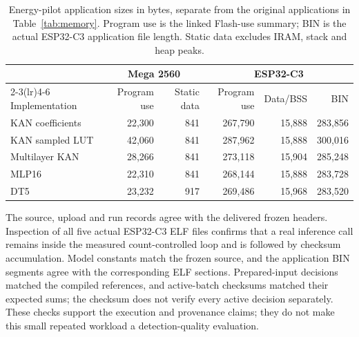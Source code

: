 \begin{table}[t]
\caption{Energy-pilot application sizes in bytes, separate from the original applications in Table~\ref{tab:memory}. Program use is the linked Flash-use summary; BIN is the actual ESP32-C3 application file length. Static data excludes IRAM, stack and heap peaks.}
\label{tab:pilot-memory}
\centering\small\setlength{\tabcolsep}{5pt}
\begin{tabular}{lrrrrr}
\toprule
& \multicolumn{2}{c}{Mega 2560} & \multicolumn{3}{c}{ESP32-C3}\\
\cmidrule(lr){2-3}\cmidrule(lr){4-6}
Implementation & Program use & Static data & Program use & Data/BSS & BIN\\
\midrule
KAN coefficients & 22,300 & 841 & 267,790 & 15,888 & 283,856\\
KAN sampled LUT & 42,060 & 841 & 287,962 & 15,888 & 300,016\\
Multilayer KAN & 28,266 & 841 & 273,118 & 15,904 & 285,248\\
MLP16 & 22,310 & 841 & 268,144 & 15,888 & 283,728\\
DT5 & 23,232 & 917 & 269,486 & 15,968 & 283,520\\
\bottomrule
\end{tabular}
\end{table}

The source, upload and run records agree with the delivered frozen headers. Inspection of all five actual ESP32-C3 ELF files confirms that a real inference call remains inside the measured count-controlled loop and is followed by checksum accumulation. Model constants match the frozen source, and the application BIN segments agree with the corresponding ELF sections. Prepared-input decisions matched the compiled references, and active-batch checksums matched their expected sums; the checksum does not verify every active decision separately. These checks support the execution and provenance claims; they do not make this small repeated workload a detection-quality evaluation.
